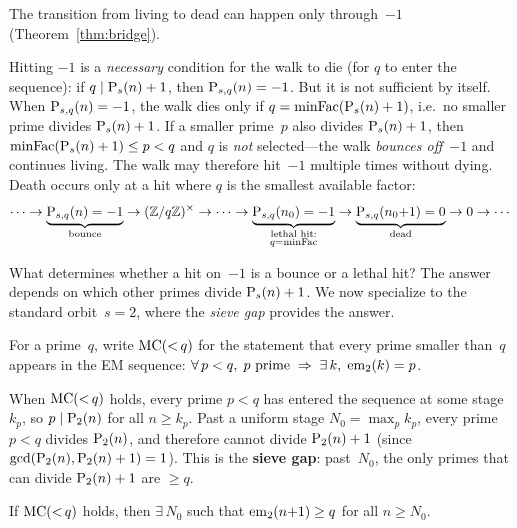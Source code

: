 \noindent The transition from living to dead can happen only
through~$-1$ (Theorem~\ref{thm:bridge}).

Hitting $-1$ is a \emph{necessary} condition for the walk to die (for
$q$ to enter the sequence): if $q \mid \mathrm{P}_{s}(n)+1$, then
$\mathrm{P}_{s,q}(n) = -1$.  But it is not sufficient by itself.  When
$\mathrm{P}_{s,q}(n) = -1$, the walk dies only if $q = \mathrm{minFac}(\mathrm{P}_{s}(n)+1)$,
i.e.\ no smaller prime divides $\mathrm{P}_{s}(n)+1$.  If a smaller prime~$p$
also divides $\mathrm{P}_{s}(n)+1$, then $\mathrm{minFac}(\mathrm{P}_{s}(n)+1) \leq p < q$
and $q$ is \emph{not} selected---the walk \emph{bounces off}~$-1$ and continues living.
The walk may therefore hit~$-1$ multiple times without dying.  Death
occurs only at a hit where $q$ is the smallest available factor:
\[
  \cdots \to \underbrace{\mathrm{P}_{s,q}(n) = -1}_{\text{bounce}}
  \to (\mathbb{Z}/q\mathbb{Z})^\times \to \cdots \to
  \underbrace{\mathrm{P}_{s,q}(n_0) = -1}_{\substack{\text{lethal hit:}\\
    q = \mathrm{minFac}}}
  \to \underbrace{\mathrm{P}_{s,q}(n_0{+}1) = 0}_{\text{dead}}
  \to 0 \to \cdots
\]

What determines whether a hit on~$-1$ is a bounce or a lethal hit?
The answer depends on which other primes divide $\mathrm{P}_{s}(n)+1$.
We now specialize to the standard orbit~$s = 2$, where the
\emph{sieve gap} provides the answer.

\begin{definition}[\defname{$\MC({<}\,q)$}]\label{def:mc-below}
For a prime~$q$, write $\MC({<}\,q)$ for the statement that every
prime smaller than~$q$ appears in the EM sequence:
$\forall\, p < q,\; p \text{ prime} \;\Rightarrow\; \exists\, k,\;
\mathrm{em}_{2}(k) = p$.
\end{definition}

\noindent When $\MC({<}\,q)$ holds, every prime $p < q$ has entered the sequence
at some stage~$k_p$, so $p \mid \mathrm{P}_{2}(n)$ for all $n \geq k_p$.
Past a uniform stage $N_0 = \max_p k_p$, every prime $p < q$ divides
$\mathrm{P}_{2}(n)$, and therefore cannot divide $\mathrm{P}_{2}(n)+1$ (since
$\gcd(\mathrm{P}_{2}(n), \mathrm{P}_{2}(n)+1) = 1$).  This is the \textbf{sieve gap}:
past~$N_0$, the only primes that can divide $\mathrm{P}_{2}(n)+1$ are
$\geq q$.

\begin{theorem}\label{thm:roughness}
If $\MC({<}\,q)$ holds, then $\exists\, N_0$ such that
$\mathrm{em}_{2}(n{+}1) \geq q$ for all $n \geq N_0$.
\end{theorem}


